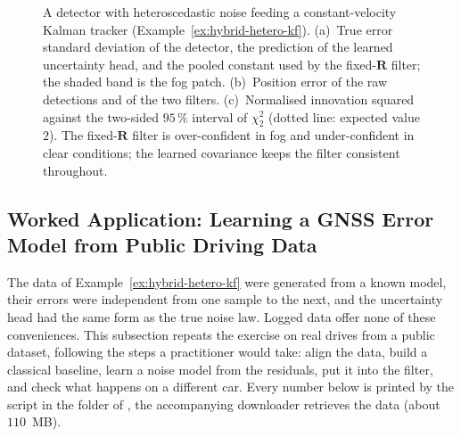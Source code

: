 \begin{figure}[!t]
{
}
\caption{A detector with heteroscedastic noise feeding a constant-velocity Kalman tracker (Example~\ref{ex:hybrid-hetero-kf}). (a)~True error standard deviation of the detector, the prediction of the learned uncertainty head, and the pooled constant used by the fixed-$\mathbf{R}$ filter; the shaded band is the fog patch. (b)~Position error of the raw detections and of the two filters. (c)~Normalised innovation squared against the two-sided $95\,\%$ interval of $\chi^{2}_{2}$ (dotted line: expected value $2$). The fixed-$\mathbf{R}$ filter is over-confident in fog and under-confident in clear conditions; the learned covariance keeps the filter consistent throughout.}
\label{fig:hybrid-hetero-kf}
\end{figure}

\subsection{Worked Application: Learning a GNSS Error Model from Public Driving Data}
\label{subsec:c2k-application}
The data of Example~\ref{ex:hybrid-hetero-kf} were generated from a known model, their errors were independent from one sample to the next, and the uncertainty head had the same form as the true noise law. Logged data offer none of these conveniences. This subsection repeats the exercise on real drives from a public dataset, following the steps a practitioner would take: align the data, build a classical baseline, learn a noise model from the residuals, put it into the filter, and check what happens on a different car. Every number below is printed by the script in the folder  of , the accompanying downloader retrieves the data (about $110$~MB).

